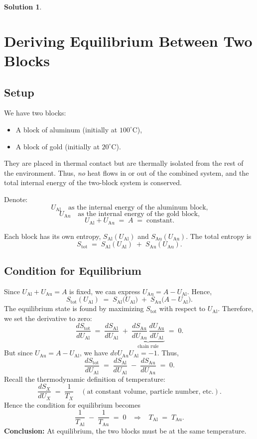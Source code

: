 \documentclass[12pt]{article}
\theoremstyle{definition} %
\newtheorem{solution}{Solution}
\theoremstyle{plain} %
\begin{document}
\begin{solution}
    \section*{Deriving Equilibrium Between Two Blocks}

\subsection*{Setup}

We have two blocks:
\begin{itemize}
    \item A block of aluminum (initially at $100^\circ\mathrm{C}$),
    \item A block of gold (initially at $20^\circ\mathrm{C}$).
\end{itemize}
They are placed in thermal contact but are thermally isolated from the rest of 
the environment. Thus, \emph{no} heat flows in or out of the combined system, 
and the total internal energy of the two-block system is conserved.

Denote:
\[
U_{\mathrm{Al}} \quad \text{as the internal energy of the aluminum block,}
\]
\[
U_{\mathrm{Au}} \quad \text{as the internal energy of the gold block,}
\]
\[
U_{\mathrm{Al}} + U_{\mathrm{Au}} \;=\; A \;=\; \text{constant}.
\]

Each block has its own entropy, $S_{\mathrm{Al}}(U_{\mathrm{Al}})$ and 
$S_{\mathrm{Au}}(U_{\mathrm{Au}})$. The total entropy is
\[
S_{\mathrm{tot}} 
\;=\; S_{\mathrm{Al}}(U_{\mathrm{Al}}) \;+\; S_{\mathrm{Au}}(U_{\mathrm{Au}}).
\]

\subsection*{Condition for Equilibrium}

Since $U_{\mathrm{Al}} + U_{\mathrm{Au}} = A$ is fixed, we can express 
$U_{\mathrm{Au}} = A - U_{\mathrm{Al}}$. Hence,
\[
S_{\mathrm{tot}}(U_{\mathrm{Al}}) 
\;=\; S_{\mathrm{Al}}\bigl(U_{\mathrm{Al}}\bigr) 
\;+\; S_{\mathrm{Au}}\bigl(A - U_{\mathrm{Al}}\bigr).
\]
The equilibrium state is found by maximizing $S_{\mathrm{tot}}$ with respect 
to $U_{\mathrm{Al}}$. Therefore, we set the derivative to zero:
\[
\frac{dS_{\mathrm{tot}}}{dU_{\mathrm{Al}}} 
\;=\; \frac{dS_{\mathrm{Al}}}{dU_{\mathrm{Al}}}
\;+\; \underbrace{\frac{dS_{\mathrm{Au}}}{dU_{\mathrm{Au}}}
\,\frac{dU_{\mathrm{Au}}}{dU_{\mathrm{Al}}}}_{\text{chain rule}} 
\;=\; 0.
\]
But since $U_{\mathrm{Au}} = A - U_{\mathrm{Al}}$, we have 
$dv{U_{\mathrm{Au}}}{U_{\mathrm{Al}}} = -1$. Thus,
\[
\frac{dS_{\mathrm{tot}}}{dU_{\mathrm{Al}}} 
\;=\; \frac{dS_{\mathrm{Al}}}{dU_{\mathrm{Al}}}
\;-\; \frac{dS_{\mathrm{Au}}}{dU_{\mathrm{Au}}}
\;=\; 0.
\]
Recall the thermodynamic definition of temperature:
\[
\frac{dS_X}{dU_X} \;=\; \frac{1}{T_X}
\quad
(\text{at constant volume, particle number, etc.}).
\]
Hence the condition for equilibrium becomes
\[
\frac{1}{T_{\mathrm{Al}}}
\;-\;
\frac{1}{T_{\mathrm{Au}}}
\;=\; 0
\;\;\;\Longrightarrow\;\;\;
T_{\mathrm{Al}} \;=\; T_{\mathrm{Au}}.
\]
\textbf{Conclusion:} 
At equilibrium, the two blocks must be at the same temperature.


\end{solution}
\end{document}
